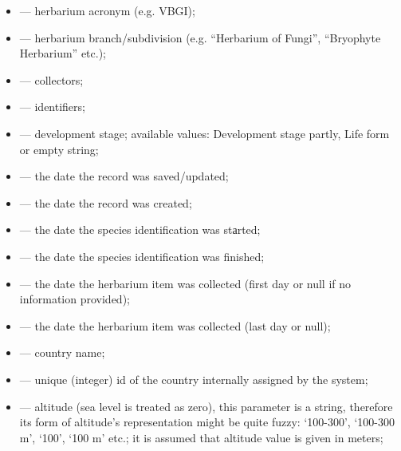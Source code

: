 \documentclass[letterpaper,10pt,english]{sphinxmanual}
\begin{document}
\begin{itemize}
\item {} 
 — herbarium acronym (e.g. VBGI);

\item {} 
 — herbarium branch/subdivision (e.g. “Herbarium of Fungi”, “Bryophyte Herbarium” etc.);

\item {} 
 — collectors;

\item {} 
 — identifiers;

\item {} 
 — development stage; available values: Development stage partly, Life form or empty string;

\item {} 
 — the date the record was saved/updated;

\item {} 
 —  the date the record was created;

\item {} 
 — the date the species identification was stаrted;

\item {} 
 — the date the species identification was finished;

\item {} 
 — the date the herbarium item was collected (first day or null if no information provided);

\item {} 
 — the date the herbarium item was collected (last day or null);

\item {} 
 —  country name;

\item {} 
 — unique (integer) id of the country internally assigned by the system;

\item {} 
 — altitude (sea level is treated as zero),
this parameter is a string, therefore its form of altitude’s
representation might be quite fuzzy: ‘100-300’, ‘100-300 m’, ‘100’, ‘100 m’ etc.; it is assumed that altitude value is given in meters;


\end{itemize}
\end{document}
